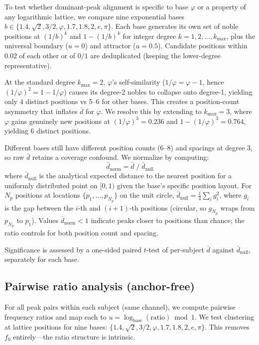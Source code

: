 \documentclass[11pt,a4paper]{article}
\newcommand{\phisym}{\varphi}
\newcommand{\fzero}{f_0}
\begin{document}
To test whether dominant-peak alignment is specific to base $\phisym$ or a property of any logarithmic lattice, we compare nine exponential bases $b \in \{1.4, \sqrt{2}, 3/2, \phisym, 1.7, 1.8, 2, e, \pi\}$. Each base generates its own set of noble positions at $(1/b)^k$ and $1 - (1/b)^k$ for integer degree $k = 1, 2, \ldots, k_{\max}$, plus the universal boundary ($u = 0$) and attractor ($u = 0.5$). Candidate positions within $0.02$ of each other or of $0/1$ are deduplicated (keeping the lower-degree representative).

At the standard degree $k_{\max} = 2$, $\phisym$'s self-similarity ($1/\phisym = \phisym - 1$, hence $(1/\phisym)^2 = 1 - 1/\phisym$) causes its degree-2 nobles to collapse onto degree-1, yielding only 4 distinct positions vs 5--6 for other bases. This creates a position-count asymmetry that inflates $\bar{d}$ for $\phisym$. We resolve this by extending to $k_{\max} = 3$, where $\phisym$ gains genuinely new positions at $(1/\phisym)^3 = 0.236$ and $1 - (1/\phisym)^3 = 0.764$, yielding 6 distinct positions.

Different bases still have different position counts (6--8) and spacings at degree 3, so raw $\bar{d}$ retains a coverage confound. We normalize by computing:
\begin{equation}
\bar{d}_{\text{norm}} = \bar{d} \;/\; \bar{d}_{\text{null}}
\end{equation}
where $\bar{d}_{\text{null}}$ is the analytical expected distance to the nearest position for a uniformly distributed point on $[0, 1)$ given the base's specific position layout. For $N_p$ positions at locations $\{p_1, \ldots, p_{N_p}\}$ on the unit circle, $\bar{d}_{\text{null}} = \frac{1}{4} \sum_{i} g_i^2$, where $g_i$ is the gap between the $i$-th and $(i+1)$-th positions (circular, so $g_{N_p}$ wraps from $p_{N_p}$ to $p_1$). Values $\bar{d}_{\text{norm}} < 1$ indicate peaks closer to positions than chance; the ratio controls for both position count and spacing.

Significance is assessed by a one-sided paired $t$-test of per-subject $\bar{d}$ against $\bar{d}_{\text{null}}$, separately for each base.

\subsection{Pairwise ratio analysis (anchor-free)}

For all peak pairs within each subject (same channel), we compute pairwise frequency ratios and map each to $u = \log_{\text{base}}(\text{ratio}) \bmod 1$. We test clustering at lattice positions for nine bases: $\{1.4, \sqrt{2}, 3/2, \phisym, 1.7, 1.8, 2, e, \pi\}$. This removes $\fzero$ entirely---the ratio structure is intrinsic.
\end{document}

